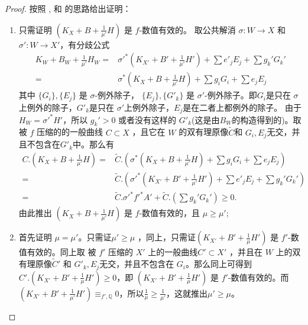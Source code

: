 \begin{proof}
  按照 \citet[Claim 13.20]{haconMinimalModelProgram2012}, \citet[Theorem 5.1]{liuSarkisovProgramGeneralized2021} 和 \citet[Theorem 4.2]{cortiFactoringBirationalMaps}的思路给出证明：
  \begin{enumerate}
    \item 只需证明 $ (K_X+B+\frac{1}{\mu'}H) $ 是 $ f $-数值有效的。 取公共解消 $\sigma:W\to X$ 和 $\sigma':W\to X'$，有分歧公式
          \[
            \begin{aligned}
              K_W+B_W+\frac{1}{\mu'}H_W= & \sigma'^*(K_{X'}+B'+\frac{1}{\mu'}H')+\sum e'_jE_j+ \sum g_k'G_k' \\
              =                          & \sigma^*(K_{X}+B+\frac{1}{\mu'}H)+\sum g_iG_i+\sum e_jE_j
            \end{aligned}
          \]
          其中 $ \{G_i\}, \{E_j\} $ 是 $ \sigma $-例外除子，  $ \{E_j\}, \{G'_k\} $ 是 $ \sigma' $-例外除子。即$ G_{i}$是只在 $\sigma$上例外的除子，$ G'_{k}$是只在 $\sigma'$上例外除子，$E_{j}$是在二者上都例外的除子。 由于  $H_W=\sigma'^*H' $，所以 $ g_k'>0 $ 或者没有这样的 $ G'_k $(这是由$B_{W}$的构造得到的)。取被 $f$ 压缩的的一般曲线 $ C\subset X $ ，且它在 $W$ 的双有理原像$ \tilde{C} $和 $ G_i, E_j $无交，并且不包含在$ G'_k $中。那么有
          \[
            \begin{aligned}
              C.\left(K_X+B+\frac{1}{\mu'}H\right)= & \tilde{C}.\left(\sigma^*\left(K_X+B+\frac{1}{\mu'}H\right)+\sum g_iG_i+\sum e_jE_j\right)           \\
              =                                     & \tilde{C}.\left(\sigma'^*\left(K_{X'}+B'+\frac{1}{\mu'}H'\right)+\sum e'_jE_j+ \sum g_k'G_k'\right) \\
              =                                     & \tilde{C}.\sigma'^*f'^*A'+\tilde{C}.\left(\sum g_k'G_k'\right) \geqslant0 .
            \end{aligned}
          \]
          由此推出 $ (K_X+B+\frac{1}{\mu'}H) $ 是 $ f $-数值有效的，且 $ \mu\geqslant \mu' $;
    \item 首先证明 $ \mu=\mu' $。只需证$\mu'\geqslant \mu $ ，同上，只需证$ (K_{X'}+B'+\frac{1}{\mu}H') $ 是 $ f' $-数值有效的。同上取 被 $f'$ 压缩的 $X'$ 上的一般曲线$ C' \subset X'$ ，并且在 $W$ 上的双有理原像$\tilde{C}'$ 和  $ G'_k, E_j $无交，并且不包含在 $ G_i $。那么同上可得到$C'.\left(K_{X'}+B'+\frac{1}{\mu}H'\right)\geqslant 0$，即 $ (K_{X'}+B'+\frac{1}{\mu}H') $ 是 $ f' $-数值有效的。而$ (K_{X'}+B'+\frac{1}{\mu'}H')\equiv_{f',\mathbb{Q}}0 $，所以$ \frac{1}{\mu}\geqslant \frac{1}{\mu'} $，这就推出$\mu'\geqslant \mu $。


\end{enumerate}
\end{proof}
